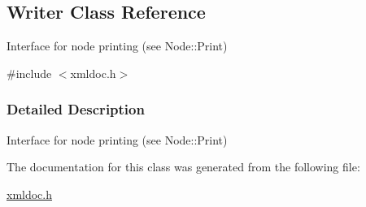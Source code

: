 \hypertarget{classWriter}{
\subsection{Writer Class Reference}
\label{classWriter}
}


Interface for node printing (see Node::Print)  




{\ttfamily \#include $<$xmldoc.h$>$}



\subsubsection{Detailed Description}
Interface for node printing (see Node::Print) 

The documentation for this class was generated from the following file:\begin{DoxyCompactItemize}
\item 
\hyperlink{xmldoc_8h}{xmldoc.h}\end{DoxyCompactItemize}
